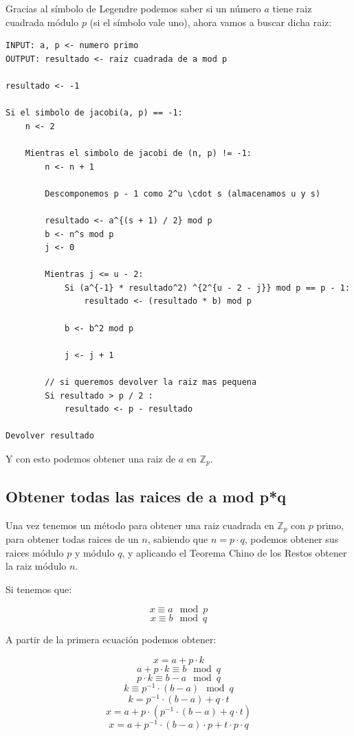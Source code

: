 \documentclass[12pt, spanish]{article}
\begin{document}
Gracias al símbolo de Legendre podemos saber si un número $a$ tiene raiz cuadrada módulo $p$ (si el símbolo vale uno), ahora vamos a buscar dicha raiz:


\begin{lstlisting}[caption={Algoritmo para obtener la raiz cuadrada modular}]
INPUT: a, p <- numero primo
OUTPUT: resultado <- raiz cuadrada de a mod p

resultado <- -1

Si el simbolo de jacobi(a, p) == -1:
	n <- 2

	Mientras el simbolo de jacobi de (n, p) != -1:
		n <- n + 1

		Descomponemos p - 1 como 2^u \cdot s (almacenamos u y s)

		resultado <- a^{(s + 1) / 2} mod p
		b <- n^s mod p
		j <- 0

		Mientras j <= u - 2:
			Si (a^{-1} * resultado^2) ^{2^{u - 2 - j}} mod p == p - 1:
				resultado <- (resultado * b) mod p

			b <- b^2 mod p

			j <- j + 1

		// si queremos devolver la raiz mas pequena
		Si resultado > p / 2 :
			resultado <- p - resultado

Devolver resultado
\end{lstlisting}

Y con esto podemos obtener una raiz de $a$ en $\mathbb{Z}_p$.

\subsection{Obtener todas las raices de a mod p*q}

Una vez tenemos un método para obtener una raiz cuadrada en $\mathbb{Z}_p$ con $p$ primo, para obtener todas raices de un $n$, sabiendo que $n = p \cdot q$, podemos obtener sus raices módulo $p$ y módulo $q$, y aplicando el Teorema Chino de los Restos obtener la raiz módulo $n$.

Si tenemos que:

$$x \equiv a \mod p$$
$$x \equiv b \mod q$$

A partir de la primera ecuación podemos obtener:

$$x = a + p \cdot k$$
$$a + p \cdot k \equiv b \mod q$$
$$p \cdot k \equiv b - a \mod q$$
$$k \equiv p^{-1} \cdot (b - a) \mod q$$
$$k = p^{-1} \cdot (b - a) + q \cdot t$$
$$x = a + p \cdot (p^{-1} \cdot (b - a) + q \cdot t )$$
$$x = a + p^{-1} \cdot (b - a) \cdot p + t \cdot p \cdot q$$
\end{document}
